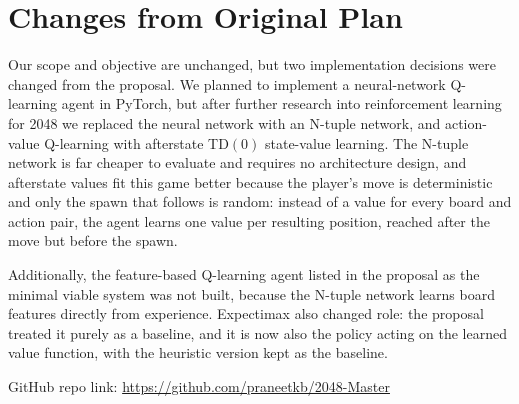 \documentclass[11pt]{article}
\begin{document}
\section*{Changes from Original Plan}

Our scope and objective are unchanged, but two implementation decisions were changed from the proposal. We planned to implement a neural-network Q-learning agent in PyTorch, but after further research into reinforcement learning for 2048 we replaced the neural network with an N-tuple network, and action-value Q-learning with afterstate TD$(0)$ state-value learning. The N-tuple network is far cheaper to evaluate and requires no architecture design, and afterstate values fit this game better because the player's move is deterministic and only the spawn that follows is random: instead of a value for every board and action pair, the agent learns one value per resulting position, reached after the move but before the spawn.

Additionally, the feature-based Q-learning agent listed in the proposal as the minimal viable system was not built, because the N-tuple network learns board features directly from experience. Expectimax also changed role: the proposal treated it purely as a baseline, and it is now also the policy acting on the learned value function, with the heuristic version kept as the baseline.

\vspace{0.5em}

GitHub repo link: \url{https://github.com/praneetkb/2048-Master}
\end{document}
